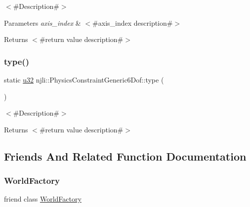 $<$\#\+Description\#$>$


\begin{DoxyParams}{Parameters}
{\em axis\+\_\+index} & $<$\#axis\+\_\+index description\#$>$\\
\hline
\end{DoxyParams}
\begin{DoxyReturn}{Returns}
$<$\#return value description\#$>$ 
\end{DoxyReturn}
\mbox{\label{classnjli_1_1_physics_constraint_generic6_dof_addf3c9314c7f54a6e816f961b89f3c5c}} 
\subsubsection{\texorpdfstring{type()}{type()}}
{\footnotesize\ttfamily static \mbox{\hyperlink{_util_8h_a10e94b422ef0c20dcdec20d31a1f5049}{u32}} njli\+::\+Physics\+Constraint\+Generic6\+Dof\+::type (\begin{DoxyParamCaption}{ }\end{DoxyParamCaption})\hspace{0.3cm}{\ttfamily [static]}}

$<$\#\+Description\#$>$

\begin{DoxyReturn}{Returns}
$<$\#return value description\#$>$ 
\end{DoxyReturn}


\subsection{Friends And Related Function Documentation}
\mbox{\label{classnjli_1_1_physics_constraint_generic6_dof_acb96ebb09abe8f2a37a915a842babfac}} 
\subsubsection{\texorpdfstring{World\+Factory}{WorldFactory}}
{\footnotesize\ttfamily friend class \mbox{\hyperlink{classnjli_1_1_world_factory}{World\+Factory}}\hspace{0.3cm}{\ttfamily [friend]}}



